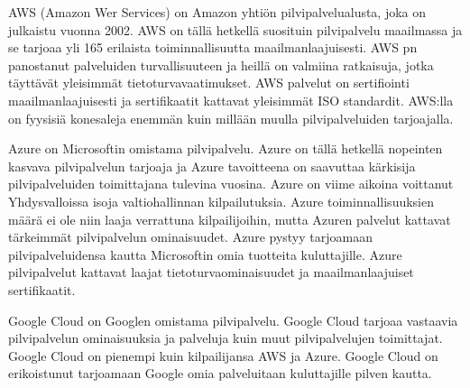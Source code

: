 AWS (Amazon Wer Services) on Amazon yhtiön pilvipalvelualusta, joka on julkaistu vuonna 2002. AWS on tällä hetkellä suosituin pilvipalvelu maailmassa ja se tarjoaa yli 165 erilaista toiminnallisuutta maailmanlaajuisesti. AWS pn panostanut palveluiden turvallisuuteen ja heillä on valmiina ratkaisuja, jotka täyttävät yleisimmät tietoturvavaatimukset. AWS palvelut on sertifiointi maailmanlaajuisesti ja sertifikaatit kattavat yleisimmät ISO standardit. AWS:lla on fyysisiä konesaleja enemmän kuin millään muulla pilvipalveluiden tarjoajalla.\citep{top_cloud}

Azure on Microsoftin omistama pilvipalvelu. Azure on tällä hetkellä nopeinten kasvava pilvipalvelun tarjoaja ja Azure tavoitteena on saavuttaa kärkisija pilvipalveluiden toimittajana tulevina vuosina. Azure on viime aikoina voittanut Yhdysvalloissa isoja valtiohallinnan kilpailutuksia. Azure toiminnallisuuksien määrä ei ole niin laaja verrattuna kilpailijoihin, mutta Azuren palvelut kattavat tärkeimmät pilvipalvelun ominaisuudet. Azure pystyy tarjoamaan pilvipalveluidensa kautta Microsoftin omia tuotteita kuluttajille. Azure pilvipalvelut kattavat laajat tietoturvaominaisuudet ja maailmanlaajuiset sertifikaatit.\citep{top_cloud}

Google Cloud on Googlen omistama pilvipalvelu. Google Cloud tarjoaa vastaavia pilvipalvelun ominaisuuksia ja palveluja kuin muut pilvipalvelujen toimittajat. Google Cloud on pienempi kuin kilpailijansa AWS ja Azure. Google Cloud on erikoistunut tarjoamaan Google omia palveluitaan kuluttajille pilven kautta.\citep{top_cloud}
